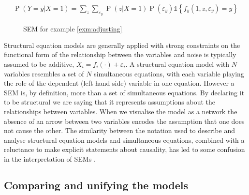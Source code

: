 \documentclass[11pt,a4paper,oneside]{book}
\newcommand{\set}[1]{\left\{#1\right\}}
\newcommand{\ind}[1]{\mathds{1}\!\!\set{#1}}
\newcommand{\eqn}[1]{\begin{align}#1\end{align}}
\renewcommand{\P}[1]{\operatorname{P}\left(#1\right)}
\theoremstyle{plain}
\theoremstyle{definition}
\let\epsilon\varepsilon
\begin{document}
\eqn{
\P{Y=y|X=1} = \sum_{z}\sum_{\epsilon_y}\P{z|X=1}\P{\epsilon_y}\ind{f_y(1,z,\epsilon_y)=y}
}


\begin{figure}[h]
\centering
{}
\caption{SEM for example \ref{exm:adjusting}}
\label{fig:sem:preschool}
\end{figure}

Structural equation models are generally applied with strong constraints on the functional form of the relationship between the variables and noise is typically assumed to be additive, $X_i = f_i(\cdot)+\epsilon_i$. A structural equation model with $N$ variables resembles a set of $N$ simultaneous equations, with each variable playing the role of the dependent (left hand side) variable in one equation. However a SEM is, by definition, more than a set of simultaneous equations. By declaring it to be structural we are saying that it represents assumptions about the relationships between variables. When we visualise the model as a network the absence of an arrow between two variables encodes the assumption that one does not cause the other. The similarity between the notation used to describe and analyse structural equation models and simultaneous equations, combined with a reluctance to make explicit statements about causality, has led to some confusion in the interpretation of SEMs \citep{heckman2015causal,Pearl2000}. 

\subsection{Comparing and unifying the models}
\label{sec:unifying_causal_models}
\end{document}
